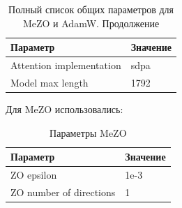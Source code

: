 \documentclass[LI,KR]{HSEUniversity}
\begin{document}
\begin{table}[H]
\centering
\begin{tabular}{|l|l|}
\hline
\textbf{Параметр} & \textbf{Значение} \\ \hline
Attention implementation & sdpa \\ \hline
Model max length & 1792 \\ \hline
\end{tabular}
\caption{Полный список общих параметров для MeZO и AdamW. Продолжение}
\label{app:mezo-parameters-2}
\end{table}

Для MeZO использовались:

\begin{table}[H]
\centering
\begin{tabular}{|l|l|}
\hline
\textbf{Параметр} & \textbf{Значение} \\ \hline
ZO epsilon & 1e-3 \\ \hline
ZO number of directions & 1 \\ \hline
\end{tabular}
\caption{Параметры MeZO}
\label{app:mezo-parameters-mezo}
\end{table}
\end{document}
